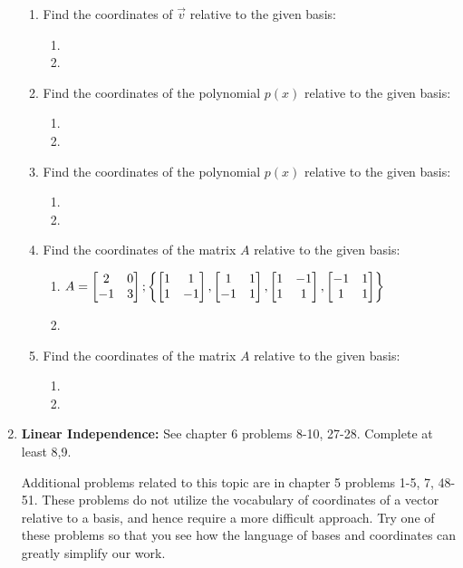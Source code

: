 \begin{enumerate}
\begin{enumerate}
	\item Find the coordinates of $\vec v$ relative to the given basis:
		\begin{enumerate}
			\item 
			\item 
		\end{enumerate}
	\item Find the coordinates of the polynomial $p(x)$ relative to the given basis:
		\begin{enumerate}
			\item 
			\item 
		\end{enumerate}
	\item Find the coordinates of the polynomial $p(x)$ relative to the given basis:
		\begin{enumerate}
			\item 
			\item 
		\end{enumerate}
	\item Find the coordinates of the matrix $A$ relative to the given basis:
		\begin{enumerate}
			\item $A=\begin{bmatrix} 2&0\\-1&3 \end{bmatrix};\left\{\begin{bmatrix} 1&1\\1&-1 \end{bmatrix},\begin{bmatrix} 1&1\\-1&1 \end{bmatrix},\begin{bmatrix} 1&-1\\1&1 \end{bmatrix},\begin{bmatrix} -1&1\\1&1 \end{bmatrix}\right\}$
			\item 
		\end{enumerate}
	\item Find the coordinates of the matrix $A$ relative to the given basis:
		\begin{enumerate}
			\item 
			\item 
		\end{enumerate}
	
\end{enumerate}

\item \textbf{Linear Independence:} \label{independence problems}
See chapter 6 problems 8-10, 27-28.  
Complete at least 8,9.	

Additional problems related to this topic are in chapter 5 problems 1-5, 7, 48-51. These problems do not utilize the vocabulary of coordinates of a vector relative to a basis, and hence require a more difficult approach.  Try one of these problems so that you see how the language of bases and coordinates can greatly simplify our work.


\end{enumerate}
